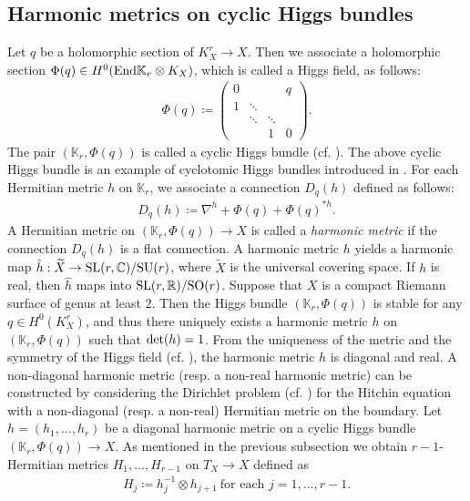 \documentclass[12pt]{article}
\theoremstyle{definition}
\def\det{{\rm det}}
\def\SO{{\rm SO}}
\def\SL{{\rm SL}}
\def\SU{{\rm SU}}
\def\End{{\rm End}}
\def\det{{\rm det}}
\def\R{{\mathbb R}}
\def\C{{\mathbb C}}
\def\K{{\mathbb K}}
\begin{document}
\subsection{Harmonic metrics on cyclic Higgs bundles}\label{2.1}
Let $q$ be a holomorphic section of $K_X^r\rightarrow X$. Then we associate a holomorphic section $\Phi(q)\in H^0(\End \K_r\otimes K_X)$, which is called a Higgs field, as follows:
\begin{align*}
\Phi(q)\coloneqq 
\left(
\begin{array}{cccc}
0 & && q \\ 
1 & \ddots && \\ 
& \ddots & \ddots & \\ 
& & 1 & 0
\end{array}
\right).
\end{align*}
The pair $(\K_r,\Phi(q))$ is called a cyclic Higgs bundle (cf. \cite{Bar1, Hit1, Hit2}). The above cyclic Higgs bundle is an example of cyclotomic Higgs bundles introduced in \cite{Sim3}. For each Hermitian metric $h$ on $\K_r$, we associate a connection $D_q(h)$ defined as follows:
\begin{align*}
D_q(h)\coloneqq \nabla^h + \Phi(q) + \Phi(q)^{\ast h}.
\end{align*}
A Hermitian metric on $(\K_r,\Phi(q))\rightarrow X$ is called a {\it harmonic metric} if the connection $D_q(h)$ is a flat connection. A harmonic metric $h$ yields a harmonic map $\hat{h}: \widetilde{X}\rightarrow \SL(r,\C)/\SU(r)$, where $\widetilde{X}$ is the universal covering space. If $h$ is real, then $\hat{h}$ maps into $\SL(r,\R)/\SO(r)$. Suppose that $X$ is a compact Riemann surface of genus at least $2$. Then the Higgs bundle $(\K_r,\Phi(q))$ is stable for any $q\in H^0(K_X^r)$, and thus there uniquely exists a harmonic metric $h$ on $(\K_r,\Phi(q))$ such that $\det(h)=1$. From the uniqueness of the metric and the symmetry of the Higgs field (cf. \cite{Bar1, Hit2}), the harmonic metric $h$ is diagonal and real. A non-diagonal harmonic metric (resp. a non-real harmonic metric) can be constructed by considering the Dirichlet problem (cf. \cite{Don1, LM2}) for the Hitchin equation with a non-diagonal (resp. a non-real) Hermitian metric on the boundary. 
Let $h=(h_1,\dots, h_r)$ be a diagonal harmonic metric on a cyclic Higgs bundle $(\K_r,\Phi(q))\rightarrow X$. As mentioned in the previous subsection we obtain $r-1$-Hermitian metrics $H_1,\dots, H_{r-1}$ on $T_X\rightarrow X$ defined as
\begin{align*}
H_j\coloneqq h_j^{-1}\otimes h_{j+1} \ \text{for each $j=1,\dots,r -1$}.
\end{align*}
\end{document}
